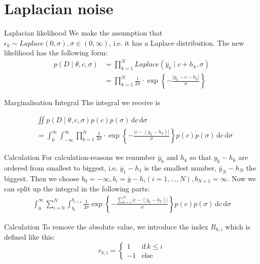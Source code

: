 \documentclass{beamer}
\newcommand{\y}{\overline{y}}
\newcommand{\dx}{\, \mathrm{d}}
\begin{document}
\section{Laplacian noise}

	\begin{frame}{Laplacian likelihood}
		We make the assumption that $\epsilon_k \sim Laplace(0, \sigma), \sigma 			\in (0, \infty)$, i.e. it has a  Laplace distribution. The new likelihood 			has the following form:
		\begin{align}
    		p(D \mid \theta, c, \sigma) &= \prod_{k = 1}^N Laplace(\y_k\mid c + 				h_k, \sigma) \\
    		&= \prod_{k = 1}^N \frac{1}{2\sigma} \cdot \exp \left\{- 							\frac{\lvert \y_k - c- h_k \lvert}{\sigma} \right\}
		\end{align}
	\end{frame}
	
	\begin{frame}{Marginalisation Integral}
		The integral we receive is

		\begin{align}
    		&\iint p(D \mid \theta, c, \sigma) p(c) p(\sigma) \dx c \dx \sigma \\
    		&= \int_0^{\infty} \int_{-\infty}^{\infty} \prod_{k = 1}^N \frac{1}					{2\sigma} \cdot \exp \left\{- \frac{\lvert c - (\y_k -h_k) \lvert}					{\sigma} \right\} p(c) p(\sigma) \dx c \dx \sigma
		\end{align}
	\end{frame}
	
	\begin{frame}{Calculation}
		For calculation-reasons we renumber $\y_k$ and $h_k$ so that $y_k - h_k$ 			are ordered from smallest to biggest, i.e. $\y_1 - h_1$ is the smallest 			number, $\y_N - h_N$ the biggest.
		Then we choose $b_0 = -\infty, b_i = \y- h_i (i = 1, \ldots, N), b_{N+1} = 		\infty$. Now we can split up the integral in the following parts:
		\begin{align}
    		\int_0^{\infty} \sum_{i = 0}^N \int_{b_i}^{b_{i+1}} \frac{1}{2\sigma} 				\exp \left\{- \frac{\sum_{k = 1}^N \lvert c - (\y_k - h_k)\lvert} 					{\sigma} \right\} p(c) p(\sigma) \dx c \dx \sigma
		\end{align}
	\end{frame}
	
	\begin{frame}{Calculation}
		To remove the absolute value, we introduce the index $R_{k, i}$ which is 			defined like this:
		\[
			r_{k, i} =
			\begin{cases}
    			1 & \text{if} \, k \leq i \\
    			-1 & \text{else}
			\end{cases}
		\]
	\end{frame}
	
\end{document}
